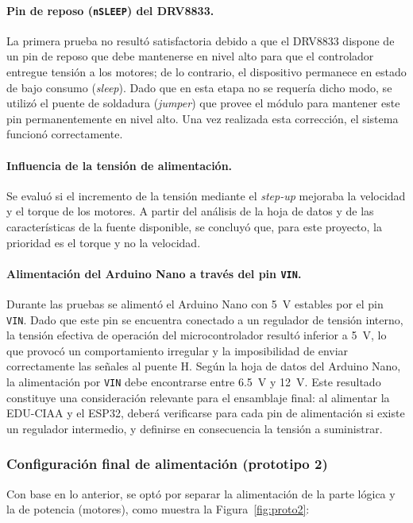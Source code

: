 \paragraph{Pin de reposo (\texttt{nSLEEP}) del DRV8833.}
La primera prueba no resultó satisfactoria debido a que el DRV8833 dispone de un pin de reposo que debe mantenerse en nivel alto para que el controlador entregue tensión a los motores; de lo contrario, el dispositivo permanece en estado de bajo consumo (\emph{sleep}). Dado que en esta etapa no se requería dicho modo, se utilizó el puente de soldadura (\emph{jumper}) que provee el módulo para mantener este pin permanentemente en nivel alto. Una vez realizada esta corrección, el sistema funcionó correctamente.

\paragraph{Influencia de la tensión de alimentación.}
Se evaluó si el incremento de la tensión mediante el \emph{step-up} mejoraba la velocidad y el torque de los motores. A partir del análisis de la hoja de datos y de las características de la fuente disponible, se concluyó que, para este proyecto, la prioridad es el torque y no la velocidad.

\paragraph{Alimentación del Arduino Nano a través del pin \texttt{VIN}.}
Durante las pruebas se alimentó el Arduino Nano con \SI{5}{V} estables por el pin \texttt{VIN}. Dado que este pin se encuentra conectado a un regulador de tensión interno, la tensión efectiva de operación del microcontrolador resultó inferior a \SI{5}{V}, lo que provocó un comportamiento irregular y la imposibilidad de enviar correctamente las señales al puente H. Según la hoja de datos del Arduino Nano, la alimentación por \texttt{VIN} debe encontrarse entre \SI{6,5}{V} y \SI{12}{V}. Este resultado constituye una consideración relevante para el ensamblaje final: al alimentar la EDU-CIAA y el ESP32, deberá verificarse para cada pin de alimentación si existe un regulador intermedio, y definirse en consecuencia la tensión a suministrar.

\subsubsection{Configuración final de alimentación (prototipo 2)}
Con base en lo anterior, se optó por separar la alimentación de la parte lógica y la de potencia (motores), como muestra la Figura~\ref{fig:proto2}:

